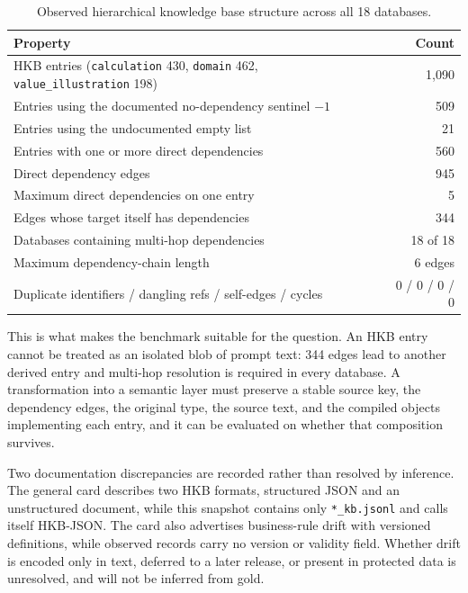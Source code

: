 \begin{table}[htbp]
\centering
\caption{Observed hierarchical knowledge base structure across all 18 databases.}
\label{tab:hkbgraph}
\begin{tabular}{lr}
\toprule
Property & Count \\
\midrule
HKB entries (\texttt{calculation} 430, \texttt{domain} 462, \texttt{value\_illustration} 198) & 1,090 \\
Entries using the documented no-dependency sentinel $-1$ & 509 \\
Entries using the undocumented empty list & 21 \\
Entries with one or more direct dependencies & 560 \\
Direct dependency edges & 945 \\
Maximum direct dependencies on one entry & 5 \\
Edges whose target itself has dependencies & 344 \\
Databases containing multi-hop dependencies & 18 of 18 \\
Maximum dependency-chain length & 6 edges \\
Duplicate identifiers / dangling refs / self-edges / cycles & 0 / 0 / 0 / 0 \\
\bottomrule
\end{tabular}
\end{table}

This is what makes the benchmark suitable for the question. An HKB entry cannot
be treated as an isolated blob of prompt text: 344 edges lead to another derived
entry and multi-hop resolution is required in every database. A transformation
into a semantic layer must preserve a stable source key, the dependency edges,
the original type, the source text, and the compiled objects implementing each
entry, and it can be evaluated on whether that composition survives.

Two documentation discrepancies are recorded rather than resolved by inference.
The general card describes two HKB formats, structured JSON and an unstructured
document, while this snapshot contains only \texttt{*\_kb.jsonl} and calls itself
HKB-JSON. The card also advertises business-rule drift with versioned
definitions, while observed records carry no version or validity field. Whether
drift is encoded only in text, deferred to a later release, or present in
protected data is unresolved, and will not be inferred from gold.

